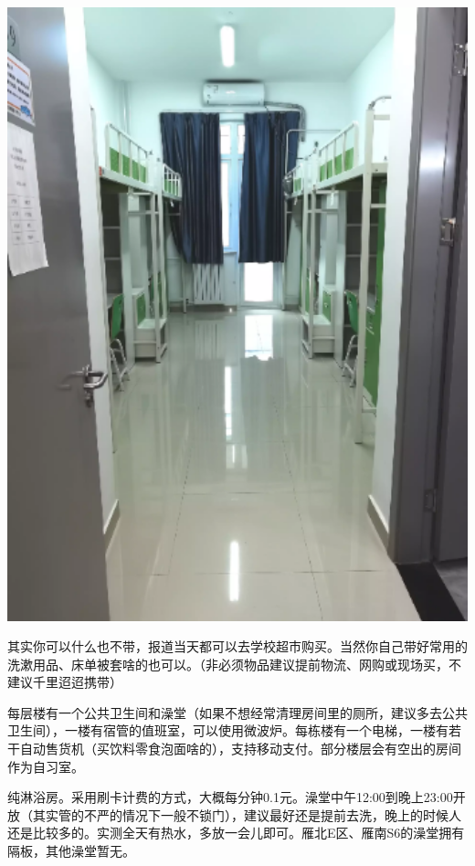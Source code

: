 \begin{center}
\begin{minipage}{0.45\textwidth}
        \centerline{\includegraphics[width=1\textwidth]{images/dorm-s6.png}}
    \end{minipage}
\end{center}


其实你可以什么也不带，报道当天都可以去学校超市购买。当然你自己带好常用的洗漱用品、床单被套啥的也可以。（非必须物品建议提前物流、网购或现场买，不建议千里迢迢携带）


每层楼有一个公共卫生间和澡堂（如果不想经常清理房间里的厕所，建议多去公共卫生间），一楼有宿管的值班室，可以使用微波炉。每栋楼有一个电梯，一楼有若干自动售货机（买饮料零食泡面啥的），支持移动支付。部分楼层会有空出的房间作为自习室。


纯淋浴房。采用刷卡计费的方式，大概每分钟0.1元。澡堂中午12:00到晚上23:00开放（其实管的不严的情况下一般不锁门），建议最好还是提前去洗，晚上的时候人还是比较多的。实测全天有热水，多放一会儿即可。雁北E区、雁南S6的澡堂拥有隔板，其他澡堂暂无。

